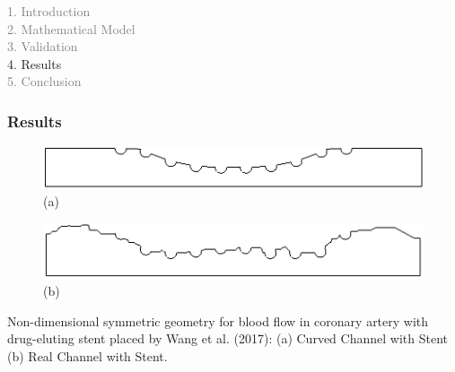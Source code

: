 
\begin{frame}
  \vspace{-1cm}
  \textcolor{gray}{1. Introduction}\\[0.1cm]
  \textcolor{gray}{2. Mathematical Model}\\[0.1cm]
  \textcolor{gray}{3. Validation}\\[0.1cm]
  4. Results\\[0.1cm]
  \textcolor{gray}{5. Conclusion}
\end{frame}



\begin{frame}
 \frametitle{\Large Results}
\begin{figure}
  \vspace{-1cm}
     \centering
     \begin{minipage}{.45\linewidth}
      \centering
      \includegraphics[scale=0.15]{images/CurvedStrut.png}\\
      \scriptsize (a)
     \end{minipage}%
     \begin{minipage}{.45\linewidth}
      \centering
      \includegraphics[scale=0.15]{images/RealStrut.png}\\
      \scriptsize (b)
     \end{minipage}
\end{figure}
\vspace{-0.3cm}
\begin{center}
\scriptsize 
     Non-dimensional symmetric geometry for blood flow in coronary artery with drug-eluting stent placed by Wang et al. (2017):
     (a) Curved Channel with Stent
     (b) Real Channel with Stent.
\end{center}
\vspace{0.05cm}
\small
\begin{center}
\begin{columns}[c]

\end{columns}
\end{center}
\end{frame}
